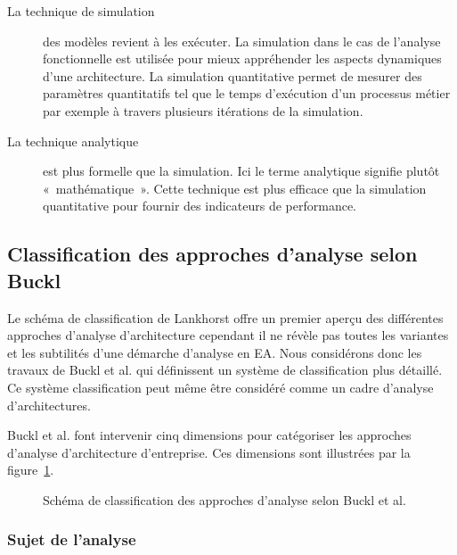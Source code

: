 \begin{description}

    \item[La technique de simulation] des modèles revient à les exécuter. La simulation 	dans le cas de l'analyse fonctionnelle est utilisée
    pour mieux appréhender les aspects dynamiques d'une architecture. La
    simulation quantitative permet de mesurer des paramètres quantitatifs tel
    que le temps d'exécution d'un processus métier par exemple à travers
    plusieurs itérations de la simulation. 

    \item[La technique analytique] est plus formelle que la simulation.  Ici le
    terme analytique signifie plutôt «~mathématique~». Cette technique est plus
    efficace que la simulation quantitative pour fournir des indicateurs de
    performance. 

\end{description}

\subsection{Classification des approches d'analyse selon Buckl}
	
Le schéma de classification de Lankhorst \cite{lankhorst2013enterprise} offre un premier aperçu des différentes approches d'analyse d'architecture cependant il ne révèle pas toutes les variantes et les subtilités d'une démarche d'analyse en EA. Nous considérons donc les travaux de Buckl et al. \cite{buckl2009classifying} qui définissent un système de classification plus détaillé. Ce système classification peut même être considéré comme un cadre d'analyse d'architectures.

Buckl et al. \cite{buckl2009classifying} font intervenir cinq dimensions pour catégoriser
les approches d'analyse d'architecture d'entreprise. Ces dimensions sont illustrées par la figure~\ref{fig:classBuckl}.

\begin{figure}[!ht]
	
	\caption{Schéma de classification des approches d'analyse selon Buckl et al. \protect\cite{buckl2009classifying}}
	\label{fig:classBuckl}
\end{figure}


\subsubsection{Sujet de l'analyse}

